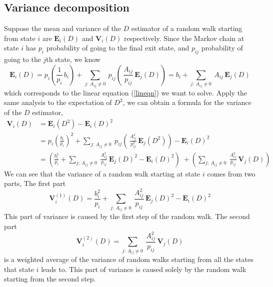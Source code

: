 \documentclass{elsart}
\theoremstyle{remark}
\theoremstyle{definition}
\theoremstyle{proof}
\begin{document}
    \subsection{Variance decomposition}
        Suppose the mean and variance of the $D$ estimator of a random walk
        starting from state $i$ are $\mathbf{E}_i(D)$ and $\mathbf{V}_i(D)$
        respectively. Since the Markov chain at state $i$ has $p_i$
        probability of going to the final exit state, and $p_{ij}$
        probability of going to the $j$th state, we know
        \[ \mathbf{E}_i(D) = p_i \left( \frac{1}{p_i}\, b_i\right) +
            \sum_{j:\,A_{ij}\ne0}\: p_{ij} \left(\,\frac{A_{ij}}{p_{ij}}\,
                                                 \mathbf{E}_j(D) \right)
            = b_i + \sum_{j:\,A_{ij}\ne0}\: A_{ij}\, \mathbf{E}_j(D)
        \]
        which corresponds to the linear equation (\ref{lineqn}) we want
        to solve. Apply the same analysis to the expectation of $D^2$,
        we can obtain a formula for the variance of the $D$ estimator,
        \begin{equation} \begin{split} \label{splittrans}
            \mathbf{V}_i(D)
            &= \mathbf{E}_i \left( D^2 \right) - \mathbf{E}_i(D)^2 \\
            &= p_i \left( \frac{b_i}{p_i}\right)^2
               + \sum_{j:\,A_{ij}\ne0}\: p_{ij}
               \left( \,\frac{A_{ij}^2}{p_{ij}^2}\, \mathbf{E}_j(D^2) \right)
               - \mathbf{E}_i(D)^2 \\
            &= \left( \frac{b_i^2}{p_i} + \sum_{j:\,A_{ij}\ne0}\:
                      \frac{A_{ij}^2}{p_{ij}}\, \mathbf{E}_j(D)^2 -
                      \mathbf{E}_i(D)^2 \right)  \;
               + \left( \sum_{j:\,A_{ij}\ne0}\: \frac{A_{ij}^2}{p_{ij}}\,
                        \mathbf{V}_j(D) \right)
        \end{split} \end{equation}
        We can see that the variance of a random walk starting at state $i$
        comes from two parts, The first part
        \begin{equation} \label{part1trans}
            \mathbf{V}_i^{(1)}(D) = \frac{b_i^2}{p_i}
            + \sum_{j:\,A_{ij}\ne0}\:
            \frac{A_{ij}^2}{p_{ij}}\, \mathbf{E}_j(D)^2
            - \mathbf{E}_i(D)^2
        \end{equation}
        This part of variance is caused by the first step of the random walk.
        The second part
        \begin{equation} \label{part2trans}
            \mathbf{V}_i^{(2)}(D) = \sum_{j:\,A_{ij}\ne0}\:
                \frac{A_{ij}^2}{p_{ij}}\, \mathbf{V}_j(D)
        \end{equation}
        is a weighted average of the variance of random walks starting from
        all the states that state $i$ leads to.  This part of variance is
        caused solely by the random walk starting from the second step.
        
\end{document}
